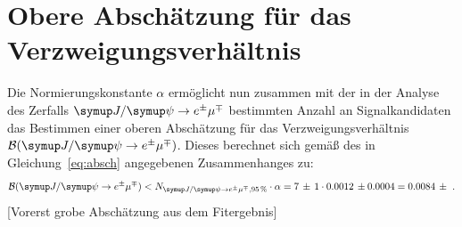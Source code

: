 \section{Obere Abschätzung für das Verzweigungsverhältnis}
%
Die Normierungskonstante $\alpha$ ermöglicht nun zusammen mit der in der Analyse des Zerfalls $\signal$ bestimmten Anzahl an Signalkandidaten das Bestimmen einer oberen Abschätzung für das Verzweigungsverhältnis $\mathcal{B}(\signal)$. Dieses berechnet sich gemäß des in Gleichung~\eqref{eq:absch} angegebenen Zusammenhanges zu:
%
\begin{equation}
  \mathcal{B}(\signal)<N_{\signal, \SI{95}{\percent}}\cdot\alpha= 7\,\pm\,1\cdot0.0012\,\pm0.0004= 0.0084\,\pm\, \, .
\end{equation}
%
[Vorerst grobe Abschätzung aus dem Fitergebnis]
